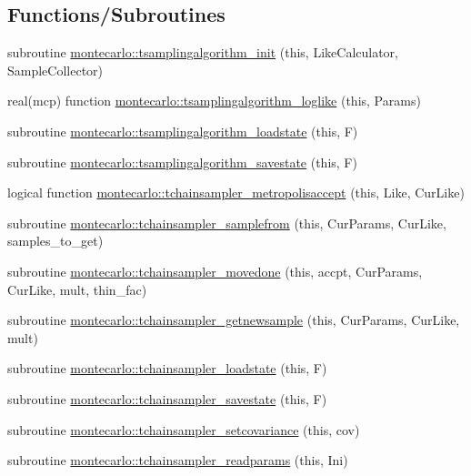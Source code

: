 \subsection*{Functions/\+Subroutines}
\begin{DoxyCompactItemize}
\item 
subroutine \mbox{\hyperlink{namespacemontecarlo_a6f22bd1167c2571095e2d1610a5b6d9b}{montecarlo\+::tsamplingalgorithm\+\_\+init}} (this, Like\+Calculator, Sample\+Collector)
\item 
real(mcp) function \mbox{\hyperlink{namespacemontecarlo_a7dd4e2ca3d6d99401730978c1b3a6638}{montecarlo\+::tsamplingalgorithm\+\_\+loglike}} (this, Params)
\item 
subroutine \mbox{\hyperlink{namespacemontecarlo_a2c622f23ed852d71991b99be82a86450}{montecarlo\+::tsamplingalgorithm\+\_\+loadstate}} (this, F)
\item 
subroutine \mbox{\hyperlink{namespacemontecarlo_a78f12d9f7d6f2a3ac0d492a9b3d7ec9a}{montecarlo\+::tsamplingalgorithm\+\_\+savestate}} (this, F)
\item 
logical function \mbox{\hyperlink{namespacemontecarlo_a61aacaca86a2550ede828d05b6b4a00f}{montecarlo\+::tchainsampler\+\_\+metropolisaccept}} (this, Like, Cur\+Like)
\item 
subroutine \mbox{\hyperlink{namespacemontecarlo_ae6147d7e7b017c36b225c6b101d896bd}{montecarlo\+::tchainsampler\+\_\+samplefrom}} (this, Cur\+Params, Cur\+Like, samples\+\_\+to\+\_\+get)
\item 
subroutine \mbox{\hyperlink{namespacemontecarlo_a51f39aa0229577c81fd7299edea28876}{montecarlo\+::tchainsampler\+\_\+movedone}} (this, accpt, Cur\+Params, Cur\+Like, mult, thin\+\_\+fac)
\item 
subroutine \mbox{\hyperlink{namespacemontecarlo_acea9a6722742a39deefda7f94ecd49bb}{montecarlo\+::tchainsampler\+\_\+getnewsample}} (this, Cur\+Params, Cur\+Like, mult)
\item 
subroutine \mbox{\hyperlink{namespacemontecarlo_a828a7ad845f1b5a7f01bfb3ccc95ac32}{montecarlo\+::tchainsampler\+\_\+loadstate}} (this, F)
\item 
subroutine \mbox{\hyperlink{namespacemontecarlo_ac9b47ebdfecc65b4663d59c74da8e573}{montecarlo\+::tchainsampler\+\_\+savestate}} (this, F)
\item 
subroutine \mbox{\hyperlink{namespacemontecarlo_aac962ce86a301904d17d4fad89a3f188}{montecarlo\+::tchainsampler\+\_\+setcovariance}} (this, cov)
\item 
subroutine \mbox{\hyperlink{namespacemontecarlo_af71e0b87a06570ba3678ee96cd444f6e}{montecarlo\+::tchainsampler\+\_\+readparams}} (this, Ini)

\end{DoxyCompactItemize}
